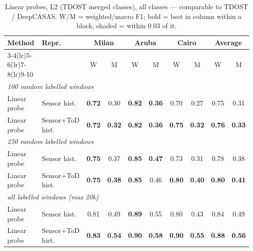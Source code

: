 \begin{table}[H]
\centering\small
\caption{Linear probes, L2 (TDOST merged classes), all classes --- comparable to TDOST / DeepCASAS. W/M = weighted/macro F1; bold = best in column within a block, shaded = within 0.03 of it.}
\label{tab:probe_l2_all}
\setlength{\tabcolsep}{3.5pt}
\begin{tabular}{llcc|cc|cc|cc}
\toprule
Method & Repr. & \multicolumn{2}{c}{Milan} & \multicolumn{2}{c}{Aruba} & \multicolumn{2}{c}{Cairo} & \multicolumn{2}{c}{Average} \\
\cmidrule(lr){3-4}\cmidrule(lr){5-6}\cmidrule(lr){7-8}\cmidrule(lr){9-10}
 & & W & M & W & M & W & M & W & M \\
\midrule
\multicolumn{10}{l}{\textit{100 random labelled windows}} \\
\midrule
Linear probe & Sensor hist. & \cellcolor{blue!12}\textbf{0.72} & \cellcolor{blue!12}0.30 & \cellcolor{blue!12}\textbf{0.82} & \cellcolor{blue!12}\textbf{0.36} & 0.70 & 0.27 & \cellcolor{blue!12}0.75 & \cellcolor{blue!12}0.31 \\
Linear probe & Sensor+ToD hist. & \cellcolor{blue!12}\textbf{0.72} & \cellcolor{blue!12}\textbf{0.32} & \cellcolor{blue!12}\textbf{0.82} & \cellcolor{blue!12}\textbf{0.36} & \cellcolor{blue!12}\textbf{0.75} & \cellcolor{blue!12}\textbf{0.32} & \cellcolor{blue!12}\textbf{0.76} & \cellcolor{blue!12}\textbf{0.33} \\
\midrule
\multicolumn{10}{l}{\textit{250 random labelled windows}} \\
\midrule
Linear probe & Sensor hist. & \cellcolor{blue!12}\textbf{0.75} & \cellcolor{blue!12}0.37 & \cellcolor{blue!12}\textbf{0.85} & \cellcolor{blue!12}\textbf{0.47} & 0.73 & 0.31 & \cellcolor{blue!12}0.78 & \cellcolor{blue!12}0.38 \\
Linear probe & Sensor+ToD hist. & \cellcolor{blue!12}\textbf{0.75} & \cellcolor{blue!12}\textbf{0.38} & \cellcolor{blue!12}\textbf{0.85} & \cellcolor{blue!12}0.46 & \cellcolor{blue!12}\textbf{0.80} & \cellcolor{blue!12}\textbf{0.40} & \cellcolor{blue!12}\textbf{0.80} & \cellcolor{blue!12}\textbf{0.41} \\
\midrule
\multicolumn{10}{l}{\textit{all labelled windows (max 20k)}} \\
\midrule
Linear probe & Sensor hist. & \cellcolor{blue!12}0.81 & 0.49 & \cellcolor{blue!12}\textbf{0.89} & 0.55 & 0.80 & 0.43 & 0.84 & 0.49 \\
Linear probe & Sensor+ToD hist. & \cellcolor{blue!12}\textbf{0.83} & \cellcolor{blue!12}\textbf{0.54} & \cellcolor{blue!12}\textbf{0.90} & \cellcolor{blue!12}\textbf{0.58} & \cellcolor{blue!12}\textbf{0.90} & \cellcolor{blue!12}\textbf{0.55} & \cellcolor{blue!12}\textbf{0.88} & \cellcolor{blue!12}\textbf{0.56} \\
\bottomrule
\end{tabular}
\end{table}
